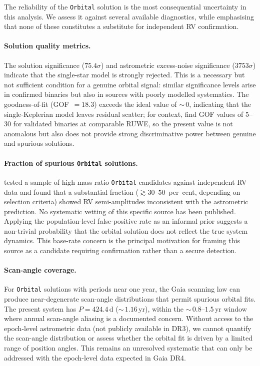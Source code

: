 \documentclass[usenatbib,fleqn]{mnras}
\begin{document}
The reliability of the \texttt{Orbital} solution is the most
consequential uncertainty in this analysis.  We assess it
against several available diagnostics, while emphasising that
none of these constitutes a substitute for independent RV
confirmation.

\paragraph*{Solution quality metrics.}
The solution significance ($75.4\sigma$) and astrometric
excess-noise significance ($3753\sigma$) indicate that the
single-star model is strongly rejected.  This is a necessary
but not sufficient condition for a genuine orbital signal: similar
significance levels arise in confirmed binaries but also in
sources with poorly modelled systematics.  The goodness-of-fit
(GOF~$= 18.3$) exceeds the ideal value of $\sim$\,0, indicating
that the single-Keplerian model leaves residual scatter; for
context, \citet{Halbwachs2023} find GOF values of 5--30 for
validated binaries at comparable RUWE, so the present value is
not anomalous but also does not provide strong discriminative
power between genuine and spurious solutions.

\paragraph*{Fraction of spurious \texttt{Orbital} solutions.}
\citet{ElBadry2024} tested a sample of high-mass-ratio
\texttt{Orbital} candidates against independent RV data and found
that a substantial fraction ($\gtrsim 30$--$50$~per~cent, depending
on selection criteria) showed RV semi-amplitudes inconsistent with
the astrometric prediction.  No systematic vetting of this specific
source has been published.  Applying the population-level
false-positive rate as an informal prior suggests a non-trivial
probability that the orbital solution does not reflect the true
system dynamics.  This base-rate concern is the principal
motivation for framing this source as a candidate requiring
confirmation rather than a secure detection.

\paragraph*{Scan-angle coverage.}
For \texttt{Orbital} solutions with periods near one year, the
Gaia scanning law can produce near-degenerate scan-angle
distributions that permit spurious orbital fits.  The present
system has $P = 424.4$\,d ($\sim$\,$1.16$\,yr), within the
$\sim$\,$0.8$--$1.5$\,yr window where annual scan-angle
aliasing is a documented concern.  Without access to the
epoch-level astrometric data (not publicly available in DR3),
we cannot quantify the scan-angle distribution or assess whether
the orbital fit is driven by a limited range of position angles.
This remains an unresolved systematic that can only be addressed
with the epoch-level data expected in Gaia DR4.
\end{document}
